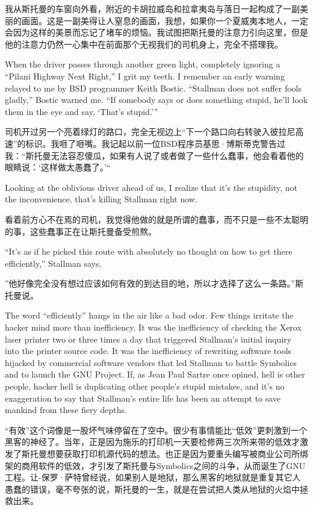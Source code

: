 \ifdefined\chs
我从斯托曼的车窗向外看，附近的卡胡拉威岛和拉拿夷岛与落日一起构成了一副美丽的画面。这是一副美得让人窒息的画面，我想，如果你一个夏威夷本地人，一定会因为这样的美景而忘记了堵车的烦恼。我试图把斯托曼的注意力引向这里，但是他的注意力仍然一心集中在前面那个无视我们的司机身上，完全不搭理我。
\fi

\ifdefined\eng
When the driver passes through another green light, completely ignoring a ``Pilani Highway Next Right,'' I grit my teeth. I remember an early warning relayed to me by BSD programmer Keith Bostic. ``Stallman does not suffer fools gladly,'' Bostic warned me. ``If somebody says or does something stupid, he'll look them in the eye and say, `That's stupid.'\hspace{0.01in}''
\fi

\ifdefined\chs
司机开过另一个亮着绿灯的路口，完全无视边上``下一个路口向右转驶入彼拉尼高速''的标识。我咂了咂嘴。我记起以前一位BSD程序员基思·博斯蒂克警告过我：``斯托曼无法容忍傻瓜，如果有人说了或者做了一些什么蠢事，他会看着他的眼睛说：`这样做太愚蠢了。'``
\fi

\ifdefined\eng
Looking at the oblivious driver ahead of us, I realize that it's the stupidity, not the inconvenience, that's killing Stallman right now.
\fi

\ifdefined\chs
看着前方心不在焉的司机，我觉得他做的就是所谓的蠢事，而不只是一些不太聪明的事，这些蠢事正在让斯托曼备受煎熬。
\fi

\ifdefined\eng
``It's as if he picked this route with absolutely no thought on how to get there efficiently,'' Stallman says.
\fi

\ifdefined\chs
''他好像完全没有想过应该如何有效的到达目的地，所以才选择了这么一条路。''斯托曼说。
\fi

\ifdefined\eng
The word ``efficiently'' hangs in the air like a bad odor. Few things irritate the hacker mind more than inefficiency. It was the inefficiency of checking the Xerox laser printer two or three times a day that triggered Stallman's initial inquiry into the printer source code. It was the inefficiency of rewriting software tools hijacked by commercial software vendors that led Stallman to battle Symbolics and to launch the GNU Project. If, as Jean Paul Sartre once opined, hell is other people, hacker hell is duplicating other people's stupid mistakes, and it's no exaggeration to say that Stallman's entire life has been an attempt to save mankind from these fiery depths.
\fi

\ifdefined\chs
``有效''这个词像是一股坏气味停留在了空中。很少有事情能比``低效''更刺激到一个黑客的神经了。当年，正是因为施乐的打印机一天要检修两三次所来带的低效才激发了斯托曼想要获取打印机源代码的想法。也正是因为要重头编写被商业公司所绑架的商用软件的低效，才引发了斯托曼与Symbolics之间的斗争，从而诞生了GNU工程。让-保罗·萨特曾经说，如果别人是地狱，那么黑客的地狱就是重复其它人愚蠢的错误，毫不夸张的说，斯托曼的一生，就是在尝试把人类从地狱的火焰中拯救出来。
\fi

